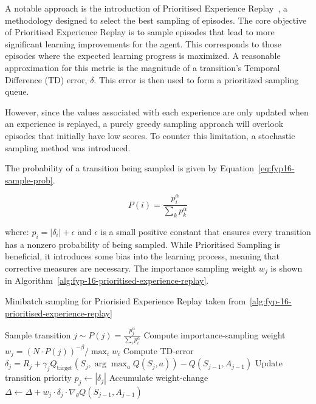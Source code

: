 A notable approach is the introduction of Prioritised Experience Replay~\cite{fyp-16-prioritised-experience-replay}, a methodology designed to select the best sampling of episodes. 
The core objective of Prioritised Experience Replay is to sample episodes that lead to more significant learning improvements for the agent. 
This corresponds to those episodes where the expected learning progress is maximized. 
A reasonable approximation for this metric is the magnitude of a transition's Temporal Difference (TD) error, $\delta$. 
This error is then used to form a prioritized sampling queue.

However, since the values associated with each experience are only updated when an experience is replayed, a purely greedy sampling approach will overlook episodes that initially have low scores.
To counter this limitation, a stochastic sampling method was introduced.

The probability of a transition being sampled is given by Equation~\ref{eq:fyp16-sample-prob}.

\begin{equation}
  P(i) = \frac{p_{i}^{\alpha}}{\sum_{k} p_{k}^{\alpha}}
  \label{eq:fyp16-sample-prob}
\end{equation}

where: $p_{i} = |\delta_{i}| + \epsilon$ and $\epsilon$ is a small positive constant that ensures every transition has a nonzero probability of being sampled.
While Prioritised Sampling is beneficial, it introduces some bias into the learning process, meaning that corrective measures are necessary. 
The importance sampling weight $w_j$ is shown in Algorithm~\ref{alg:fyp-16-prioritised-experience-replay}.

\begin{algorithm}
  \caption{Minibatch sampling for Priorisied Experience Replay taken from~\ref{alg:fyp-16-prioritised-experience-replay}}
  \label{alg:fyp-16-prioritised-experience-replay}
  \begin{algorithmic}[1]
      \State Sample transition $j \sim P(j) = \frac{p^{\alpha}_j}{\sum_i p^{\alpha}_i}$
      \State Compute importance-sampling weight $w_j = \left( N \cdot P(j) \right)^{-\beta} / \max_i w_i$
      \State Compute TD-error $\delta_j = R_j + \gamma_j Q_{\text{target}} \left( S_j, \arg\max_a Q(S_j, a) \right) - Q(S_{j-1}, A_{j-1})$
      \State Update transition priority $p_j \leftarrow |\delta_j|$
      \State Accumulate weight-change $\Delta \leftarrow \Delta + w_j \cdot \delta_j \cdot \nabla_{\theta}Q(S_{j-1}, A_{j-1})$
  \EndFor
  \end{algorithmic}
  \end{algorithm}  
  

